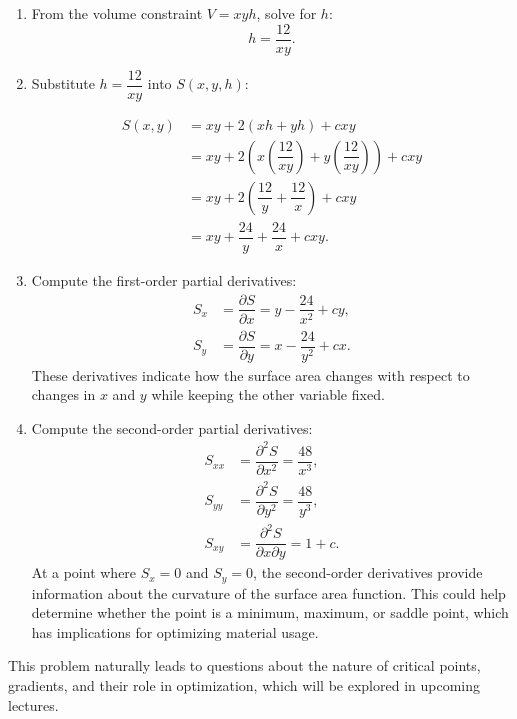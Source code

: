 \begin{solution}
\begin{enumerate}
    \item From the volume constraint \( V = x y h \), solve for \( h \):
    \[
    h = \frac{12}{x y}.
    \]

    \item Substitute \( h = \dfrac{12}{x y} \) into \( S(x, y, h) \):

    \begin{align*}
    S(x, y) &= x y + 2\left(x h + y h\right) + c x y \\
    &= x y + 2\left( x \left( \dfrac{12}{x y} \right) + y \left( \dfrac{12}{x y} \right) \right) + c x y \\
    &= x y + 2\left( \dfrac{12}{y} + \dfrac{12}{x} \right) + c x y \\
    &= x y + \dfrac{24}{y} + \dfrac{24}{x} + c x y.
    \end{align*}


    \item Compute the first-order partial derivatives:
    \begin{align*}
    S_x &= \dfrac{\partial S}{\partial x} = y - \dfrac{24}{x^2} + c y, \\
    S_y &= \dfrac{\partial S}{\partial y} = x - \dfrac{24}{y^2} + c x.
    \end{align*}
    These derivatives indicate how the surface area changes with respect to changes in \( x \) and \( y \) while keeping the other variable fixed.

    \item Compute the second-order partial derivatives:
    \begin{align*}
    S_{xx} &= \dfrac{\partial^2 S}{\partial x^2} = \dfrac{48}{x^3}, \\
    S_{yy} &= \dfrac{\partial^2 S}{\partial y^2} = \dfrac{48}{y^3}, \\
    S_{xy} &= \dfrac{\partial^2 S}{\partial x \partial y} = 1 + c.
    \end{align*}
    At a point where \( S_x = 0 \) and \( S_y = 0 \), the second-order derivatives provide information about the curvature of the surface area function. This could help determine whether the point is a minimum, maximum, or saddle point, which has implications for optimizing material usage.
\end{enumerate}

\noindent This problem naturally leads to questions about the nature of critical points, gradients, and their role in optimization, which will be explored in upcoming lectures.
\end{solution}
\exampleline


